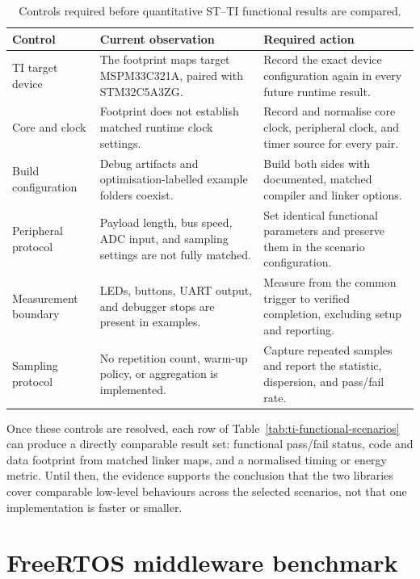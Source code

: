 \begin{table}[H]
\centering
\caption{Controls required before quantitative ST--TI functional results are compared.}
\label{tab:ti-functional-controls}
\begin{tabularx}{\textwidth}{l X X}
\toprule
\textbf{Control} & \textbf{Current observation} & \textbf{Required action} \\
\midrule
TI target device & The footprint maps target MSPM33C321A, paired with STM32C5A3ZG. & Record the exact device configuration again in every future runtime result. \\
Core and clock & Footprint does not establish matched runtime clock settings. & Record and normalise core clock, peripheral clock, and timer source for every pair. \\
Build configuration & Debug artifacts and optimisation-labelled example folders coexist. & Build both sides with documented, matched compiler and linker options. \\
Peripheral protocol & Payload length, bus speed, ADC input, and sampling settings are not fully matched. & Set identical functional parameters and preserve them in the scenario configuration. \\
Measurement boundary & LEDs, buttons, UART output, and debugger stops are present in examples. & Measure from the common trigger to verified completion, excluding setup and reporting. \\
Sampling protocol & No repetition count, warm-up policy, or aggregation is implemented. & Capture repeated samples and report the statistic, dispersion, and pass/fail rate. \\
\bottomrule
\end{tabularx}
\end{table}

Once these controls are resolved, each row of Table~\ref{tab:ti-functional-scenarios} can
produce a directly comparable result set: functional pass/fail status, code and data footprint
from matched linker maps, and a normalised timing or energy metric. Until then, the evidence
supports the conclusion that the two libraries cover comparable low-level behaviours across
the selected scenarios, not that one implementation is faster or smaller.

\section{FreeRTOS middleware benchmark}
\label{sec:ti-freertos}

